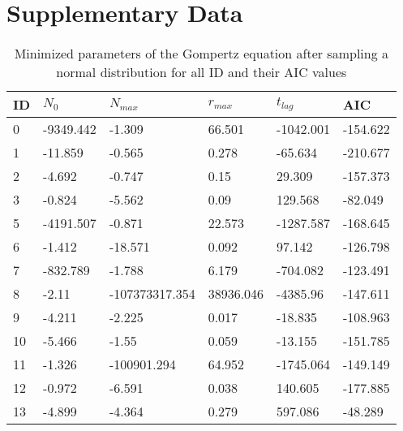 \documentclass[11pt]{article}
\begin{document}

\nolinenumbers

\pagebreak
\section{Supplementary Data}
    \footnotesize
    \begin{center}
    \begin{longtable}{llllll}
        \caption{Minimized parameters of the Gompertz equation after sampling a normal distribution for all ID and their AIC values}
        \label{table:3}\\
        ID  & $N_{0}$       & $N_{max}$                 & $r_{max}$            & $t_{lag}$      & AIC      \\
        \midrule
        0   & -9349.442  & -1.309                 & 66.501            & -1042.001          & -154.622 \\
        1   & -11.859    & -0.565                 & 0.278             & -65.634            & -210.677 \\
        2   & -4.692     & -0.747                 & 0.15              & 29.309             & -157.373 \\
        3   & -0.824     & -5.562                 & 0.09              & 129.568            & -82.049  \\
        5   & -4191.507  & -0.871                 & 22.573            & -1287.587          & -168.645 \\
        6   & -1.412     & -18.571                & 0.092             & 97.142             & -126.798 \\
        7   & -832.789   & -1.788                 & 6.179             & -704.082           & -123.491 \\
        8   & -2.11      & -107373317.354         & 38936.046         & -4385.96           & -147.611 \\
        9   & -4.211     & -2.225                 & 0.017             & -18.835            & -108.963 \\
        10  & -5.466     & -1.55                  & 0.059             & -13.155            & -151.785 \\
        11  & -1.326     & -100901.294            & 64.952            & -1745.064          & -149.149 \\
        12  & -0.972     & -6.591                 & 0.038             & 140.605            & -177.885 \\
        13  & -4.899     & -4.364                 & 0.279             & 597.086            & -48.289  \\

\end{longtable}
\end{center}
\end{document}
